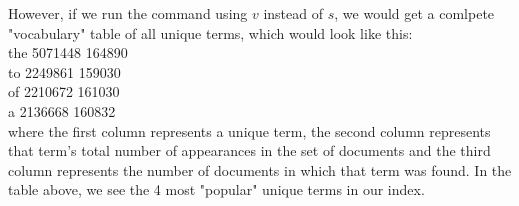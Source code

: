 \documentclass[letterpaper,11pt]{article}
\begin{document}
However, if we run the command using $v$ instead of $s$, we would get a comlpete "vocabulary" table of all unique terms, which would look like this: \\
the 5071448 164890\\
to 2249861 159030\\
of 2210672 161030\\
a 2136668 160832\\
where the first column represents a unique term, the second column represents that term's total number of appearances in the set of documents and the third column represents the number of documents in which that term was found. In the table above, we see the 4 most "popular" unique terms in our index.
































    
\end{document}

